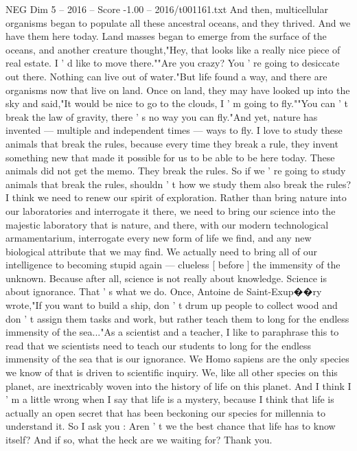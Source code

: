 \begin{textsample}{NEG Dim 5 – 2016 – Score -1.00 – 2016/t001161.txt}
And then, multicellular organisms began to populate all these ancestral oceans, and they thrived.
And we have them here today.
Land masses began to emerge from the surface of the oceans, and another creature thought,"Hey, that looks like a really nice piece of real estate.
I ' d like to move there.""Are you crazy?
You ' re going to desiccate out there.
Nothing can live out of water."But life found a way, and there are organisms now that live on land.
Once on land, they may have looked up into the sky and said,"It would be nice to go to the clouds, I ' m going to fly.""You can ' t break the law of gravity, there ' s no way you can fly."And yet, nature has invented — multiple and independent times — ways to fly.
I love to study these animals that break the rules, because every time they break a rule, they invent something new that made it possible for us to be able to be here today.
These animals did not get the memo.
They break the rules.
So if we ' re going to study animals that break the rules, shouldn ' t how we study them also break the rules?
I think we need to renew our spirit of exploration.
Rather than bring nature into our laboratories and interrogate it there, we need to bring our science into the majestic laboratory that is nature, and there, with our modern technological armamentarium, interrogate every new form of life we find, and any new biological attribute that we may find.
We actually need to bring all of our intelligence to becoming stupid again — clueless [ before ] the immensity of the unknown.
Because after all, science is not really about knowledge.
Science is about ignorance.
That ' s what we do.
Once, Antoine de Saint-Exup{\EmojiFont �}{\EmojiFont �}ry wrote,"If you want to build a ship, don ' t drum up people to collect wood and don ' t assign them tasks and work, but rather teach them to long for the endless immensity of the sea..."As a scientist and a teacher, I like to paraphrase this to read that we scientists need to teach our students to long for the endless immensity of the sea that is our ignorance.
We Homo sapiens are the only species we know of that is driven to scientific inquiry.
We, like all other species on this planet, are inextricably woven into the history of life on this planet.
And I think I ' m a little wrong when I say that life is a mystery, because I think that life is actually an open secret that has been beckoning our species for millennia to understand it.
So I ask you : Aren ' t we the best chance that life has to know itself?
And if so, what the heck are we waiting for?
Thank you.

\end{textsample}
